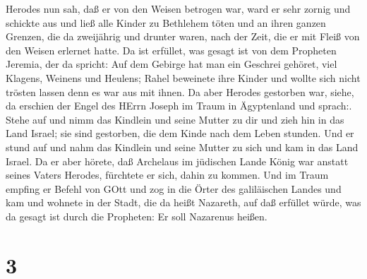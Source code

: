 Herodes nun sah, daß er von den Weisen betrogen war, ward er sehr zornig
und schickte aus und ließ alle Kinder zu Bethlehem töten und an ihren
ganzen Grenzen, die da zweijährig und drunter waren, nach der Zeit, die
er mit Fleiß von den Weisen erlernet hatte.  Da ist
erfüllet, was gesagt ist von dem Propheten Jeremia, der da spricht:
 Auf dem Gebirge hat man ein Geschrei gehöret, viel
Klagens, Weinens und Heulens; Rahel beweinete ihre Kinder und wollte
sich nicht trösten lassen denn es war aus mit ihnen.  Da
aber Herodes gestorben war, siehe, da erschien der Engel des HErrn
Joseph im Traum in Ägyptenland  und sprach:. Stehe auf und
nimm das Kindlein und seine Mutter zu dir und zieh hin in das Land
Israel; sie sind gestorben, die dem Kinde nach dem Leben stunden.
 Und er stund auf und nahm das Kindlein und seine Mutter zu
sich und kam in das Land Israel.  Da er aber hörete, daß
Archelaus im jüdischen Lande König war anstatt seines Vaters Herodes,
fürchtete er sich, dahin zu kommen. Und im Traum empfing er Befehl von
GOtt und zog in die Örter des galiläischen Landes  und kam
und wohnete in der Stadt, die da heißt Nazareth, auf daß erfüllet würde,
was da gesagt ist durch die Propheten: Er soll Nazarenus heißen.

\hypertarget{section-2}{%
\section{3}\label{section-2}}

